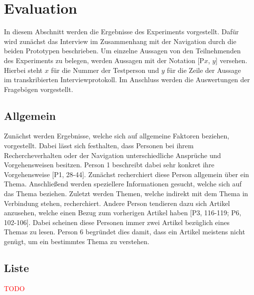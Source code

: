 \section{Evaluation}\label{sec:results}
In diesem Abschnitt werden die Ergebnisse des Experiments vorgestellt.
Dafür wird zunächst das Interview im Zusammenhang mit der Navigation durch die beiden Prototypen beschrieben.
Um einzelne Aussagen von den Teilnehmenden des Experiments zu belegen, werden Aussagen mit der Notation [P$x$, $y$] versehen.
Hierbei steht $x$ für die Nummer der Testperson und $y$ für die Zeile der Aussage im transkribierten Interviewprotokoll.
Im Anschluss werden die Auswertungen der Fragebögen vorgestellt.

\subsection{Allgemein}
Zunächst werden Ergebnisse, welche sich auf allgemeine Faktoren beziehen, vorgestellt.
Dabei lässt sich festhalten, dass Personen bei ihrem Rechercheverhalten oder der Navigation unterschiedliche Ansprüche und Vorgehensweisen besitzen.
Person 1 beschreibt dabei sehr konkret ihre Vorgehensweise [P1, 28-44].
Zunächst recherchiert diese Person allgemein über ein Thema.
Anschließend werden speziellere Informationen gesucht, welche sich auf das Thema beziehen.
Zuletzt werden Themen, welche indirekt mit dem Thema in Verbindung stehen, recherchiert.
Andere Person tendieren dazu sich Artikel anzusehen, welche einen Bezug zum vorherigen Artikel haben [P3, 116-119; P6, 102-106].
Dabei scheinen diese Personen immer zwei Artikel bezüglich eines Themas zu lesen.
Person 6 begründet dies damit, dass ein Artikel meistens nicht genügt, um ein bestimmtes Thema zu verstehen.







\subsection{Liste}
\textcolor{red}{TODO}

